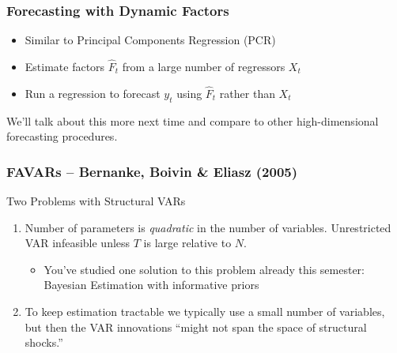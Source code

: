 \documentclass[handout]{beamer}
\begin{document}
\begin{frame}[c]\frametitle{Forecasting with Dynamic Factors}
    
 \begin{itemize}
 	\item Similar to Principal Components Regression (PCR)
 	\item Estimate factors $\widehat{F}_t$ from a large number of regressors $X_t$
 	\item Run a regression to forecast $y_t$ using $\widehat{F}_t$ rather than $X_t$ 
 \end{itemize}

\vspace{2em}

\alert{We'll talk about this more next time and compare to other high-dimensional forecasting procedures.}

\end{frame}
\begin{frame}[c]\frametitle{FAVARs -- Bernanke, Boivin \& Eliasz (2005)}
   
   \begin{block}
    	{Two Problems with Structural VARs}
    	\begin{enumerate}
    		\item Number of parameters is \emph{quadratic} in the number of variables. Unrestricted VAR infeasible unless $T$ is large relative to $N$.\begin{itemize}
    			\item You've studied one solution to this problem already this semester: Bayesian Estimation with informative priors 
    		\end{itemize}
    		\item To keep estimation tractable we typically use a small number of variables, but then the VAR innovations ``might not span the space of structural shocks.''
    	\end{enumerate}
    \end{block} 


\end{frame}
\end{document}
